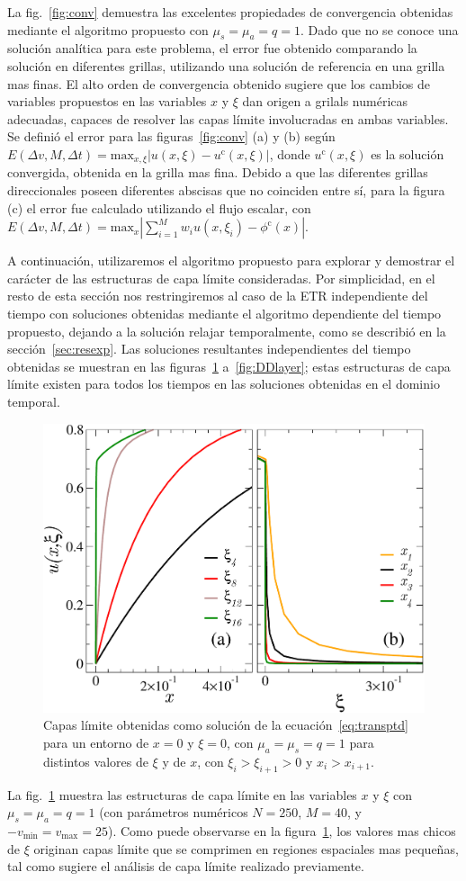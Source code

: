 La fig.~\eqref{fig:conv} demuestra las excelentes propiedades de convergencia 
obtenidas mediante el algoritmo propuesto con $\mu_s=\mu_a=q=1$. Dado 
que no se conoce una solución analítica para este problema, 
el error fue obtenido comparando la solución en diferentes grillas, utilizando 
una solución de referencia en una grilla mas finas. El alto orden 
de convergencia obtenido sugiere que los cambios de variables 
propuestos en las variables $x$ y $\xi$ dan origen a grilals numéricas 
adecuadas, capaces de resolver las capas límite involucradas en ambas variables. 
Se definió el error para las figuras~\eqref{fig:conv} (a) y (b) según
  $E(\Delta v, M,\Delta t)=\text{max}_{x,\xi}
    |u(x,\xi)-u^{\text{c}}(x,\xi)|$, donde $u^{\text{c}}(x,\xi)$ 
    es la solución convergida, obtenida en la grilla mas fina. 
Debido a que las diferentes 
    grillas direccionales poseen diferentes abscisas que no coinciden 
    entre sí, para la figura (c) 
    el error fue calculado utilizando el flujo escalar, con  
$E(\Delta v, M,\Delta t)=\text{max}_x |\sum_{i=1}^M w_i u(x,\xi_i)-\phi^{\text{c}}(x)|$.

A continuación, utilizaremos el algoritmo propuesto para 
explorar y demostrar el carácter de las estructuras de capa límite 
consideradas. Por simplicidad, en el resto de esta sección nos restringiremos 
al caso de la ETR independiente del tiempo con soluciones 
obtenidas mediante el algoritmo dependiente del tiempo propuesto, 
dejando a la solución relajar temporalmente, como se describió 
en la sección~\ref{sec:resexp}. Las soluciones resultantes independientes del 
tiempo obtenidas se muestran en las figuras~\ref{fig:blayers1} 
a~\ref{fig:DDlayer}; estas estructuras de capa límite 
existen para todos los tiempos en las soluciones obtenidas 
en el dominio temporal. 

\begin{figure}[h!]
\centering
  \includegraphics[width=0.5\linewidth]{figuras/xilay.pdf}
  \caption{Capas límite obtenidas como solución 
  de la ecuación~\eqref{eq:transptd} para un entorno de $x=0$ y $\xi=0$, 
  con $\mu_a=\mu_s=q=1$ para distintos valores de $\xi$ y de $x$, 
  con $\xi_i>\xi_{i+1}>0$ y $x_i>x_{i+1}$.}
 \label{fig:blayers1}
\end{figure}
La fig.~\ref{fig:blayers1} muestra las estructuras de capa límite en las 
variables $x$ y $\xi$ con $\mu_s=\mu_a=q=1$ (con parámetros numéricos $N=250$, $M=40$, 
y $-v_{\text{min}}=v_{\text{max}}=25$). Como puede observarse 
en la figura~\ref{fig:blayers1}, los valores mas chicos de $\xi$ 
originan capas límite que se comprimen en regiones espaciales mas 
pequeñas, tal como sugiere el análisis de capa límite realizado 
previamente. 

